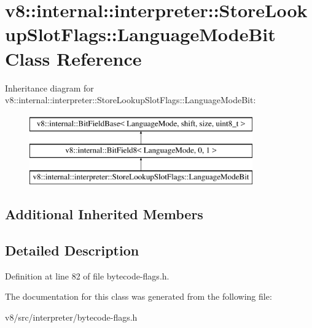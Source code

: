 \hypertarget{classv8_1_1internal_1_1interpreter_1_1StoreLookupSlotFlags_1_1LanguageModeBit}{}\section{v8\+:\+:internal\+:\+:interpreter\+:\+:Store\+Lookup\+Slot\+Flags\+:\+:Language\+Mode\+Bit Class Reference}
\label{classv8_1_1internal_1_1interpreter_1_1StoreLookupSlotFlags_1_1LanguageModeBit}
Inheritance diagram for v8\+:\+:internal\+:\+:interpreter\+:\+:Store\+Lookup\+Slot\+Flags\+:\+:Language\+Mode\+Bit\+:\begin{figure}[H]
\begin{center}
\leavevmode
\includegraphics[height=3.000000cm]{classv8_1_1internal_1_1interpreter_1_1StoreLookupSlotFlags_1_1LanguageModeBit}
\end{center}
\end{figure}
\subsection*{Additional Inherited Members}


\subsection{Detailed Description}


Definition at line 82 of file bytecode-\/flags.\+h.



The documentation for this class was generated from the following file\+:\begin{DoxyCompactItemize}
\item 
v8/src/interpreter/bytecode-\/flags.\+h\end{DoxyCompactItemize}
